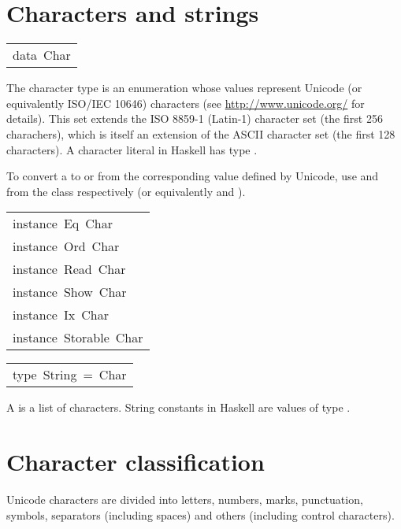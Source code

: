\section{Characters and strings
}
\begin{haddockdesc}
\item[\begin{tabular}{@{}l}
data\ Char
\end{tabular}]\haddockbegindoc
The character type  is an enumeration whose values represent
Unicode (or equivalently ISO/IEC 10646) characters
(see \url{http://www.unicode.org/} for details).
This set extends the ISO 8859-1 (Latin-1) character set
(the first 256 charachers), which is itself an extension of the ASCII
character set (the first 128 characters).
A character literal in Haskell has type .
\par
To convert a  to or from the corresponding  value defined
by Unicode, use  and  from the
 class respectively (or equivalently  and ).
\par

\end{haddockdesc}
\begin{haddockdesc}
\item[\begin{tabular}{@{}l}
instance\ Eq\ Char\\instance\ Ord\ Char\\instance\ Read\ Char\\instance\ Show\ Char\\instance\ Ix\ Char\\instance\ Storable\ Char
\end{tabular}]
\end{haddockdesc}
\begin{haddockdesc}
\item[\begin{tabular}{@{}l}
type\ String\ =\ {\char 91}Char{\char 93}
\end{tabular}]\haddockbegindoc
A  is a list of characters.  String constants in Haskell are values
 of type .
\par

\end{haddockdesc}
\section{Character classification
}
Unicode characters are divided into letters, numbers, marks,
 punctuation, symbols, separators (including spaces) and others
 (including control characters).
\par

